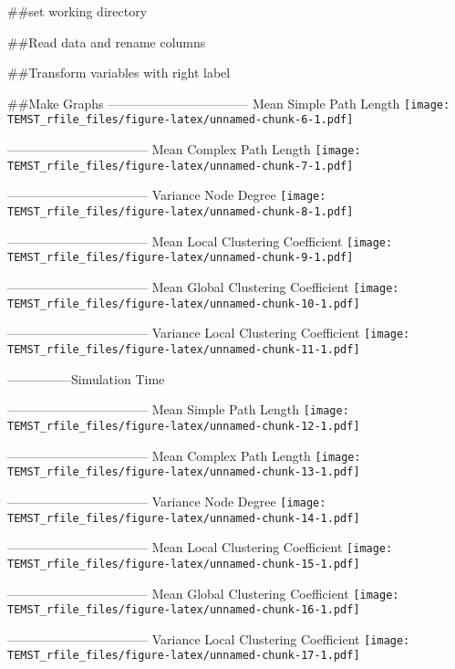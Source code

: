 \documentclass[
]{article}
\author{}
\date{\vspace{-2.5em}}
\begin{document}
\#\#set working directory

\#\#Read data and rename columns

\#\#Transform variables with right label

\#\#Make Graphs --------------------------------- Mean Simple Path
Length
\texttt{[image: TEMST\_rfile\_files/figure-latex/unnamed-chunk-6-1.pdf]}

--------------------------------- Mean Complex Path Length
\texttt{[image: TEMST\_rfile\_files/figure-latex/unnamed-chunk-7-1.pdf]}

--------------------------------- Variance Node Degree
\texttt{[image: TEMST\_rfile\_files/figure-latex/unnamed-chunk-8-1.pdf]}

--------------------------------- Mean Local Clustering Coefficient
\texttt{[image: TEMST\_rfile\_files/figure-latex/unnamed-chunk-9-1.pdf]}

--------------------------------- Mean Global Clustering Coefficient
\texttt{[image: TEMST\_rfile\_files/figure-latex/unnamed-chunk-10-1.pdf]}

--------------------------------- Variance Local Clustering Coefficient
\texttt{[image: TEMST\_rfile\_files/figure-latex/unnamed-chunk-11-1.pdf]}

---------------Simulation Time

--------------------------------- Mean Simple Path Length
\texttt{[image: TEMST\_rfile\_files/figure-latex/unnamed-chunk-12-1.pdf]}

--------------------------------- Mean Complex Path Length
\texttt{[image: TEMST\_rfile\_files/figure-latex/unnamed-chunk-13-1.pdf]}

--------------------------------- Variance Node Degree
\texttt{[image: TEMST\_rfile\_files/figure-latex/unnamed-chunk-14-1.pdf]}

--------------------------------- Mean Local Clustering Coefficient
\texttt{[image: TEMST\_rfile\_files/figure-latex/unnamed-chunk-15-1.pdf]}

--------------------------------- Mean Global Clustering Coefficient
\texttt{[image: TEMST\_rfile\_files/figure-latex/unnamed-chunk-16-1.pdf]}

--------------------------------- Variance Local Clustering Coefficient
\texttt{[image: TEMST\_rfile\_files/figure-latex/unnamed-chunk-17-1.pdf]}
\end{document}
